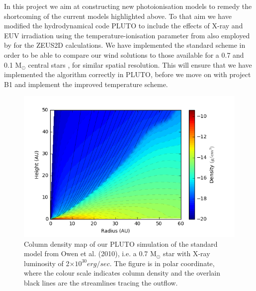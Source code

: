 \documentclass[10pt,fleqn,twoside]{article}
\begin{document}
In this project we aim at constructing new photoionisation models to
remedy the shortcoming of the current models highlighted above. To
that aim we have modified the hydrodynamical code PLUTO 
\citep{2007ApJS..170..228M, 2012A&A...545A.152M}
to include the
effects of X-ray and EUV irradiation using the temperature-ionisation
parameter from 
\citet{2008ApJ...688..398E, 2009ApJ...699.1639E}
also employed by 
\citet{2010MNRAS.401.1415O}
for the ZEUS2D calculations. We have implemented the
standard scheme in order to be able to compare our wind solutions to 
those available for a 0.7 and 0.1 M$_\odot$ central
stars 
\citep{2010MNRAS.401.1415O, 2011MNRAS.412...13O, 2012MNRAS.422.1880O},
for similar spatial
resolution. This will ensure that we have implemented the algorithm
correctly in PLUTO, before we move on with project B1 and implement
the improved temperature scheme. 



\begin{figure}
  \includegraphics[width=0.85\linewidth]{streamlines.png}
  \caption{Column density map of our PLUTO simulation of the standard
    model from Owen et al. (2010), i.e. a 0.7 M$_{\odot}$ star with
X-ray luminosity of 2$\times 10^{30} erg/sec$. The figure is in polar coordinate,
    where the colour scale indicates column density and the overlain
    black lines are the streamlines tracing the outflow. }
  \label{fig:streamlines}
\end{figure}
\end{document}
